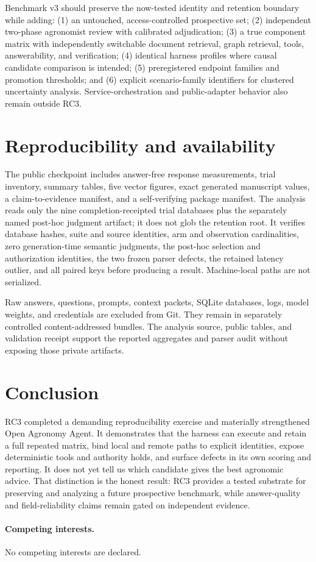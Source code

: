 \documentclass[9pt,twocolumn]{article}
\newcommand{\system}{Open Agronomy Agent}
\begin{document}
Benchmark v3 should preserve the now-tested identity and retention boundary while adding: (1) an untouched, access-controlled prospective set; (2) independent two-phase agronomist review with calibrated adjudication; (3) a true component matrix with independently switchable document retrieval, graph retrieval, tools, answerability, and verification; (4) identical harness profiles where causal candidate comparison is intended; (5) preregistered endpoint families and promotion thresholds; and (6) explicit scenario-family identifiers for clustered uncertainty analysis. Service-orchestration and public-adapter behavior also remain outside RC3.

\section{Reproducibility and availability}

The public checkpoint includes answer-free response measurements, trial inventory, summary tables, five vector figures, exact generated manuscript values, a claim-to-evidence manifest, and a self-verifying package manifest. The analysis reads only the nine completion-receipted trial databases plus the separately named post-hoc judgment artifact; it does not glob the retention root. It verifies database hashes, suite and source identities, arm and observation cardinalities, zero generation-time semantic judgments, the post-hoc selection and authorization identities, the two frozen parser defects, the retained latency outlier, and all paired keys before producing a result. Machine-local paths are not serialized.

Raw answers, questions, prompts, context packets, SQLite databases, logs, model weights, and credentials are excluded from Git. They remain in separately controlled content-addressed bundles. The analysis source, public tables, and validation receipt support the reported aggregates and parser audit without exposing those private artifacts.

\section{Conclusion}

RC3 completed a demanding reproducibility exercise and materially strengthened \system{}. It demonstrates that the harness can execute and retain a full repeated matrix, bind local and remote paths to explicit identities, expose deterministic tools and authority holds, and surface defects in its own scoring and reporting. It does not yet tell us which candidate gives the best agronomic advice. That distinction is the honest result: RC3 provides a tested substrate for preserving and analyzing a future prospective benchmark, while answer-quality and field-reliability claims remain gated on independent evidence.

\paragraph{Competing interests.} No competing interests are declared.


{\footnotesize}
\end{document}
